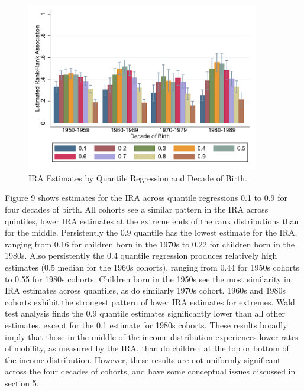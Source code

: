 \documentclass[notitlepage,12pt]{article}
\begin{document}
\begin{figure}
  \centering
  \caption{IRA Estimates by Quantile Regression and Decade of Birth.}
  \includegraphics[width=4in]{Graph22.pdf}
\end{figure}
Figure 9 shows estimates for the IRA across quantile regressions 0.1 to 0.9 for four decades of birth.  All cohorts see a similar pattern in the IRA across quintiles, lower IRA estimates at the extreme ends of the rank distributions than for the middle.  Persistently the 0.9 quantile has the lowest estimate for the IRA, ranging from 0.16 for children born in the 1970s to 0.22 for children born in the 1980s.  Also persistently the 0.4 quantile regression produces relatively high estimates (0.5 median for the 1960s cohorts), ranging from 0.44 for 1950s cohorts to 0.55 for 1980s cohorts.  Children born in the 1950s see the most similarity in IRA estimates across quantiles, as do similarly 1970s cohort.  1960s and 1980s cohorts exhibit the strongest pattern of lower IRA estimates for extremes.  Wald test analysis finds the 0.9 quantile estimates significantly lower than all other estimates, except for the 0.1 estimate for 1980s cohorts.  These results broadly imply that those in the middle of the income distribution experiences lower rates of mobility, as measured by the IRA, than do children at the top or bottom of the income distribution.  However, these results are not uniformly significant across the four decades of cohorts, and have some conceptual issues discussed in section 5.
\end{document}

